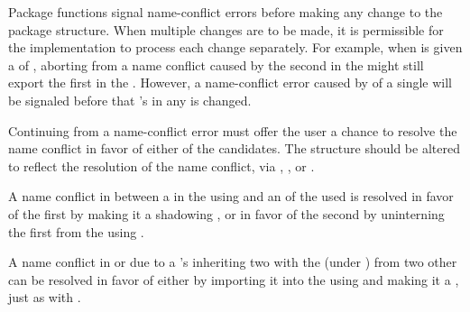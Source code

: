 
  \itemitem{--} 
  Package functions signal name-conflict errors  before making any
  change to the package structure.  When multiple changes are to be made,
  it is
  permissible for the implementation to process each change separately.
  For example, when  is given a 
 of 
,
  aborting from a name
  conflict caused by the second  
  in the  might still export the
  first  in the .  
  However, a name-conflict error caused by 
  of a single  will be signaled before
  that 's  in any  is changed.

\itemitem{--} 
Continuing from a name-conflict error must offer the user a chance to
resolve the name conflict in favor of either of the candidates.  The
structure should be altered to reflect the resolution of the
name conflict, via , 
,
or .

\itemitem{--} 
A name conflict in  between a  
 in the using  and an  of the used 
 is resolved in favor of the first  by making it a
shadowing , or in favor of the second  by uninterning
the first  from the using . 

\itemitem{--} 
A name conflict in  or  
due to a 's inheriting two   
with the   (under )
from two other  can be resolved in
favor of either  by importing it into the using
 and making it a ,
just as with .
\endlist

\endsubsubsubsection%

\endsubsubsection%

\endsubSection%


